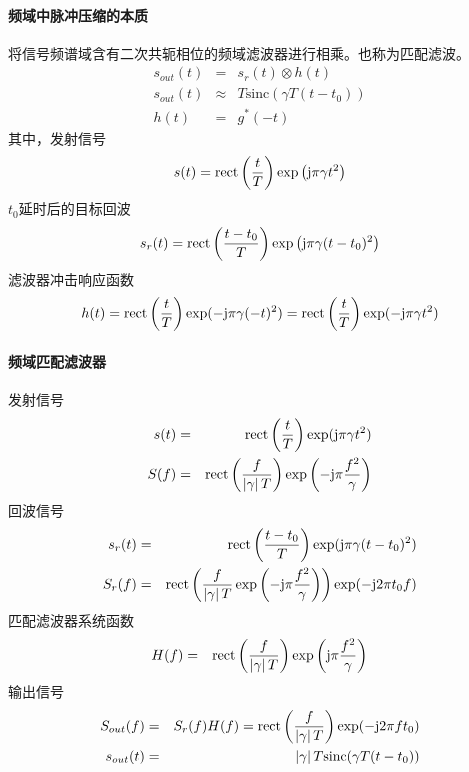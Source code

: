 \paragraph{频域中脉冲压缩的本质}
将信号频谱域含有二次共轭相位的频域滤波器进行相乘。也称为匹配滤波。
\begin{eqnarray}
s_{out}(t) &=& s_r(t)\otimes h(t) \\
s_{out}(t) &\approx& T\mathrm{sinc}(\gamma T( t-t_0 )) \\
h(t) &=& g^*(-t)
\end{eqnarray}
其中，发射信号
\begin{equation}
s(t) = \mathrm{rect}\left(\frac{t}{T}\right)\exp\left( \mathrm{j}\pi\gamma t^2 \right)
\end{equation}
$t_0$延时后的目标回波
\begin{equation}
s_r(t) = \mathrm{rect}\left(\frac{t-t_0}{T}\right)\exp\left(\mathrm{j}\pi\gamma(t-t_0)^2\right)
\end{equation}
滤波器冲击响应函数
\begin{equation}
h(t) = \mathrm{rect}\left(\frac{t}{T}\right)\exp(-\mathrm{j}\pi\gamma(-t)^2) = \mathrm{rect}\left(\frac{t}{T}\right)\exp(-\mathrm{j}\pi\gamma t^2)
\end{equation}
\paragraph{频域匹配滤波器}
发射信号
\begin{eqnarray}
s(t) &=& \mathrm{rect}\left(\frac{t}{T}\right)\exp(\mathrm{j}\pi\gamma t^2) \\
S(f) &=& \mathrm{rect}\left(\frac{f}{\left| \gamma \right|T}\right)\exp\left(-\mathrm{j}\pi\frac{f^2}{\gamma}\right)
\end{eqnarray}
回波信号
\begin{eqnarray}
s_r(t) &=& \mathrm{rect}\left(\frac{t-t_0}{T}\right)\exp(\mathrm{j}\pi\gamma(t - t_0)^2) \\
S_r(f) &=& \mathrm{rect}\left(\frac{f}{\left| \gamma \right|T}\exp\left(-\mathrm{j}\pi\frac{f^2}{\gamma}\right)\right)\exp(-\mathrm{j}2\pi t_0f) \\
\end{eqnarray}
匹配滤波器系统函数
\begin{eqnarray}
H(f) &=& \mathrm{rect}\left(\frac{f}{\left| \gamma \right|T}\right)\exp\left(\mathrm{j}\pi\frac{f^2}{\gamma}\right)
\end{eqnarray}
输出信号
\begin{eqnarray}
S_{out}(f) &=& S_r(f)H(f) = \mathrm{rect}\left(\frac{f}{\left| \gamma \right|T}\right)\exp(-\mathrm{j}2\pi ft_0) \\
s_{out}(t )&=& \left| \gamma \right|T\mathrm{sinc}(\gamma T(t-t_0))
\end{eqnarray}
